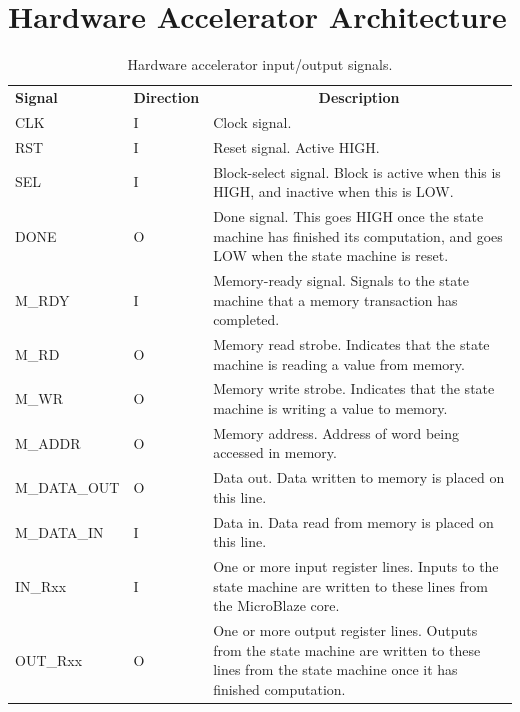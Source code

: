 \documentclass{UoYCSproject}
\begin{document}
\section{Hardware Accelerator Architecture}

\begin{table}[H]
\centering
\begin{tabular}{ |p{3cm}|p{2cm}|p{8cm}| }
\textbf{Signal} & \textbf{Direction} & \multicolumn{1}{c}{\textbf{Description}} \\
CLK             & I                  & Clock signal. \\[0.05cm]
RST             & I                  & Reset signal. Active HIGH. \\[0.05cm]
SEL             & I                  & Block-select signal. Block is active when this is HIGH, and inactive when this is LOW. \\[0.05cm]
DONE            & O                  & Done signal. This goes HIGH once the state machine has finished its computation, and goes LOW when the state machine is reset. \\[0.05cm]
M\_RDY          & I                  & Memory-ready signal. Signals to the state machine that a memory transaction has completed. \\[0.05cm]
M\_RD           & O                  & Memory read strobe. Indicates that the state machine is reading a value from memory. \\[0.05cm]
M\_WR           & O                  & Memory write strobe. Indicates that the state machine is writing a value to memory. \\[0.05cm]
M\_ADDR         & O                  & Memory address. Address of word being accessed in memory. \\[0.05cm]
M\_DATA\_OUT    & O                  & Data out. Data written to memory is placed on this line. \\[0.05cm]
M\_DATA\_IN     & I                  & Data in. Data read from memory is placed on this line. \\[0.05cm]
IN\_Rxx         & I                  & One or more input register lines. Inputs to the state machine are written to these lines from the MicroBlaze core. \\[0.05cm]
OUT\_Rxx        & O                  & One or more output register lines. Outputs from the state machine are written to these lines from the state machine once it has finished computation.
\end{tabular}
\caption{Hardware accelerator input/output signals.}
\label{table:acceleratorSignals}
\end{table}
\end{document}
